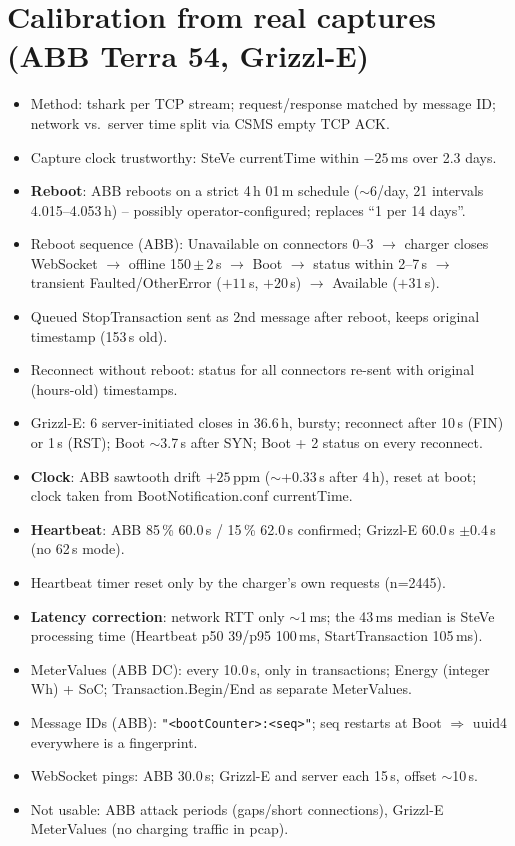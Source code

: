 \documentclass[11pt]{article}
\begin{document}
\section{Calibration from real captures (ABB Terra 54, Grizzl-E)}
\begin{itemize}
  \item Method: tshark per TCP stream; request/response matched by message ID; network vs.\ server time split via CSMS empty TCP ACK.
  \item Capture clock trustworthy: SteVe currentTime within $-25$\,ms over 2.3 days.
  \item \textbf{Reboot}: ABB reboots on a strict 4\,h 01\,m schedule ($\sim$6/day, 21 intervals 4.015--4.053\,h) -- possibly operator-configured; replaces ``1 per 14 days''.
  \item Reboot sequence (ABB): Unavailable on connectors 0--3 $\to$ charger closes WebSocket $\to$ offline 150\,$\pm$\,2\,s $\to$ Boot $\to$ status within 2--7\,s $\to$ transient Faulted/OtherError ($+11$\,s, $+20$\,s) $\to$ Available ($+31$\,s).
  \item Queued StopTransaction sent as 2nd message after reboot, keeps original timestamp (153\,s old).
  \item Reconnect without reboot: status for all connectors re-sent with original (hours-old) timestamps.
  \item Grizzl-E: 6 server-initiated closes in 36.6\,h, bursty; reconnect after 10\,s (FIN) or 1\,s (RST); Boot $\sim$3.7\,s after SYN; Boot + 2 status on every reconnect.
  \item \textbf{Clock}: ABB sawtooth drift $+25$\,ppm ($\sim$+0.33\,s after 4\,h), reset at boot; clock taken from BootNotification.conf currentTime.
  \item \textbf{Heartbeat}: ABB 85\,\% 60.0\,s / 15\,\% 62.0\,s confirmed; Grizzl-E 60.0\,s $\pm$0.4\,s (no 62\,s mode).
  \item Heartbeat timer reset only by the charger's own requests (n=2445).
  \item \textbf{Latency correction}: network RTT only $\sim$1\,ms; the 43\,ms median is SteVe processing time (Heartbeat p50 39/p95 100\,ms, StartTransaction 105\,ms).
  \item MeterValues (ABB DC): every 10.0\,s, only in transactions; Energy (integer Wh) + SoC; Transaction.Begin/End as separate MeterValues.
  \item Message IDs (ABB): \texttt{"<bootCounter>:<seq>"}; seq restarts at Boot $\Rightarrow$ uuid4 everywhere is a fingerprint.
  \item WebSocket pings: ABB 30.0\,s; Grizzl-E and server each 15\,s, offset $\sim$10\,s.
  \item Not usable: ABB attack periods (gaps/short connections), Grizzl-E MeterValues (no charging traffic in pcap).
\end{itemize}
\end{document}
